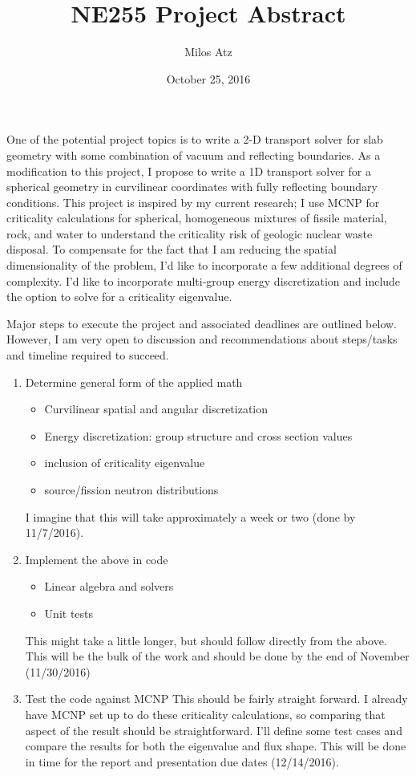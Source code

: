 \documentclass[11pt, oneside]{article}   	%
\title{NE255 Project Abstract}
\author{Milos Atz}
\date{October 25, 2016}
\begin{document}
\maketitle

One of the potential project topics is to write a 2-D transport solver for slab geometry with some combination of vacuum and reflecting boundaries. As a modification to this project, I propose to write a 1D transport solver for a spherical geometry in curvilinear coordinates with fully reflecting boundary conditions. This project is inspired by my current research; I use MCNP for criticality calculations for spherical, homogeneous mixtures of fissile material, rock, and water to understand the criticality risk of geologic nuclear waste disposal. To compensate for the fact that I am reducing the spatial dimensionality of the problem, I'd like to incorporate a few additional degrees of complexity. I'd like to incorporate multi-group energy discretization and include the option to solve for a criticality eigenvalue.

Major steps to execute the project and associated deadlines are outlined below. However, I am very open to discussion and recommendations about steps/tasks and timeline required to succeed.

\begin{enumerate}
\item{Determine general form of the applied math
	\begin{itemize}
	\item{Curvilinear spatial and angular discretization}
	\item{Energy discretization: group structure and cross section values}
	\item{inclusion of criticality eigenvalue}
	\item{source/fission neutron distributions}
	\end{itemize}
	I imagine that this will take approximately a week or two (done by 11/7/2016).}
\item{Implement the above in code
	\begin{itemize}
	\item{Linear algebra and solvers}
	\item{Unit tests}
	\end{itemize}
	This might take a little longer, but should follow directly from the above. This will be the bulk of the work and should be done by the end of November (11/30/2016)}
\item{Test the code against MCNP
	This should be fairly straight forward. I already have MCNP set up to do these criticality calculations, so comparing that aspect of the result should be straightforward. I'll define some test cases and compare the results for both the eigenvalue and flux shape. This will be done in time for the report and presentation due dates (12/14/2016).}
\end{enumerate}
\end{document}

